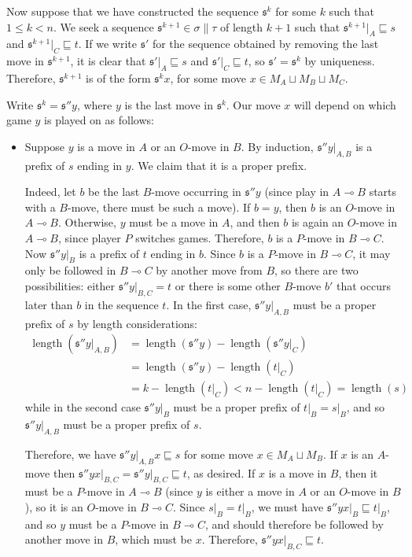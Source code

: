 \documentclass[11pt]{article} %
\theoremstyle{plain} %
\theoremstyle{definition} %
\theoremstyle{note}
\theoremstyle{exercisestyle}
\renewcommand{\implies}{\multimap}
\newcommand{\cprd}{\sqcup}
\newcommand{\s}{\mathfrak s}
\newcommand{\prefix}{\sqsubseteq}
\DeclareMathOperator{\length}{length}
\begin{document}
Now suppose that we have constructed the sequence $\s^k$ for some $k$ such that $1\le k<n$.  We seek a sequence $\s^{k+1}\in \sigma\|\tau$ of length $k+1$ such that $\s^{k+1}\vert_A\prefix s$ and $\s^{k+1}\vert_C\prefix t$.  If we write $\s'$ for the sequence obtained by removing the last move in $\s^{k+1}$, it is clear that $\s'\vert_A\prefix s$ and $\s'\vert_C\prefix t$, so $\s'=\s^k$ by uniqueness.  Therefore, $\s^{k+1}$ is of the form $\s^kx$, for some move $x\in M_A\cprd M_B\cprd M_C$.  

Write $\s^k=\s''y$, where $y$ is the last move in $\s^k$.  Our move $x$ will depend on which game $y$ is played on as follows:

\begin{itemize}
  \item Suppose $y$ is a move in $A$ or an $O$-move in $B$.  By induction, $\s''y\vert_{A,B}$ is a prefix of $s$ ending in $y$.  We claim that it is a proper prefix.  

    Indeed, let $b$ be the last $B$-move occurring in $\s''y$ (since play in $A\implies B$ starts with a $B$-move, there must be such a move).  If $b=y$, then $b$ is an $O$-move in $A\implies B$.  Otherwise, $y$ must be a move in $A$, and then $b$ is again an $O$-move in $A\implies B$, since player $P$ switches games.  Therefore, $b$ is a $P$-move in $B\implies C$.  Now $\s''y\vert_B$ is a prefix of $t$ ending in $b$.  Since $b$ is a $P$-move in $B\implies C$, it may only be followed in $B\implies C$ by another move from $B$, so there are two possibilities: either $\s''y\vert_{B,C}=t$ or there is some other $B$-move $b'$ that occurs later than $b$ in the sequence $t$.  In the first case, $\s''y\vert_{A,B}$ must be a proper prefix of $s$ by length considerations:
    \begin{align*}
      \length(\s''y\vert_{A,B}) & = \length(\s''y) - \length(\s''y\vert_C) \\
        & = \length(\s''y) - \length(t\vert_C) \\
        & = k - \length(t\vert_C) < n - \length(t\vert_C) = \length(s)
    \end{align*}
    while in the second case $\s''y\vert_B$ must be a proper prefix of $t\vert_B=s\vert_B$, and so $\s''y\vert_{A,B}$ must be a proper prefix of $s$.

    Therefore, we have $\s''y\vert_{A,B}x\prefix s$ for some move $x\in M_A\cprd M_B$.  If $x$ is an $A$-move then $\s''yx\vert_{B,C}=\s''y\vert_{B,C}\prefix t$, as desired.  If $x$ is a move in $B$, then it must be a $P$-move in $A\implies B$ (since $y$ is either a move in $A$ or an $O$-move in $B$), so it is an $O$-move in $B\implies C$.  Since $s\vert_B=t\vert_B$, we must have $\s''yx\vert_B\prefix t\vert_B$, and so $y$ must be a $P$-move in $B\implies C$, and should therefore be followed by another move in $B$, which must be $x$.  Therefore, $\s''yx\vert_{B,C}\prefix t$.


\end{itemize}
\end{document}
